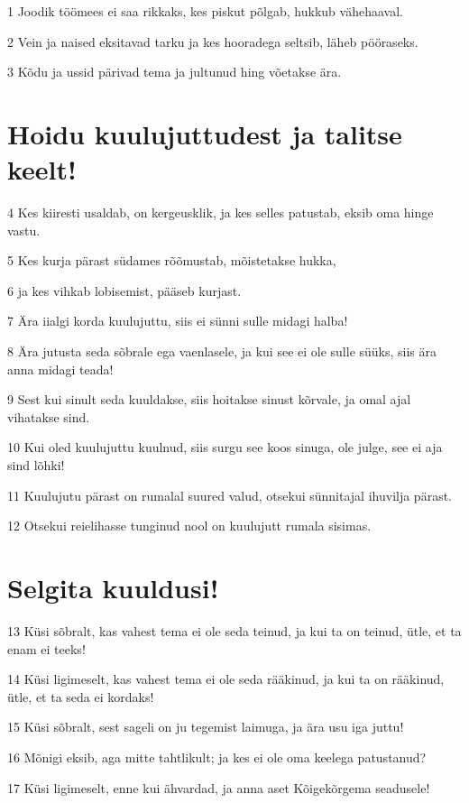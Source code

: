 \par 1 Joodik töömees ei saa rikkaks, kes piskut põlgab, hukkub vähehaaval.
\par 2 Vein ja naised eksitavad tarku ja kes hooradega seltsib, läheb pööraseks.
\par 3 Kõdu ja ussid pärivad tema ja jultunud hing võetakse ära.

\section*{Hoidu kuulujuttudest ja talitse keelt!}

\par 4 Kes kiiresti usaldab, on kergeusklik, ja kes selles patustab, eksib oma hinge vastu.
\par 5 Kes kurja pärast südames rõõmustab, mõistetakse hukka,
\par 6 ja kes vihkab lobisemist, pääseb kurjast.
\par 7 Ära iialgi korda kuulujuttu, siis ei sünni sulle midagi halba!
\par 8 Ära jutusta seda sõbrale ega vaenlasele, ja kui see ei ole sulle süüks, siis ära anna midagi teada!
\par 9 Sest kui sinult seda kuuldakse, siis hoitakse sinust kõrvale, ja omal ajal vihatakse sind.
\par 10 Kui oled kuulujuttu kuulnud, siis surgu see koos sinuga, ole julge, see ei aja sind lõhki!
\par 11 Kuulujutu pärast on rumalal suured valud, otsekui sünnitajal ihuvilja pärast.
\par 12 Otsekui reielihasse tunginud nool on kuulujutt rumala sisimas.

\section*{Selgita kuuldusi!}

\par 13 Küsi sõbralt, kas vahest tema ei ole seda teinud, ja kui ta on teinud, ütle, et ta enam ei teeks!
\par 14 Küsi ligimeselt, kas vahest tema ei ole seda rääkinud, ja kui ta on rääkinud, ütle, et ta seda ei kordaks!
\par 15 Küsi sõbralt, sest sageli on ju tegemist laimuga, ja ära usu iga juttu!
\par 16 Mõnigi eksib, aga mitte tahtlikult; ja kes ei ole oma keelega patustanud?
\par 17 Küsi ligimeselt, enne kui ähvardad, ja anna aset Kõigekõrgema seadusele!

